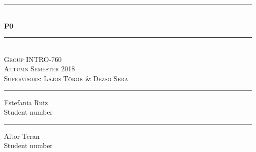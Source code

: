 
\usepackage[export]{adjustbox}

\newcommand\tab[1][1cm]{\hspace*{#1}}


	
\begin{titlingpage}

\begin{center}
	
	
\newcommand{\HRule}{\rule{\linewidth}{0.1mm}} %

\vspace*{5cm}

\HRule \\[0.8cm]
{\huge \bfseries \textsc{P0}}\\[0.2cm]
\HRule \\[1.5cm]


\textsc{\huge Group INTRO-760}\\
\textsc{\large Autumn Semester 2018}\\
\textsc{Supervisors: Lajos Török \& Dezso Sera}

\vspace{50pt}
\begin{minipage}{0.25\linewidth}
	\centering
	\hrule
	\vspace{12pt}
	Estefania Ruiz\\ %
	Student number %
\end{minipage}
\hspace{10pt}
\begin{minipage}{0.25\linewidth}
	\centering
	\hrule
	\vspace{12pt}
	Aitor Teran\\ %
	Student number %


\end{minipage}
\end{center}
\end{titlingpage}
